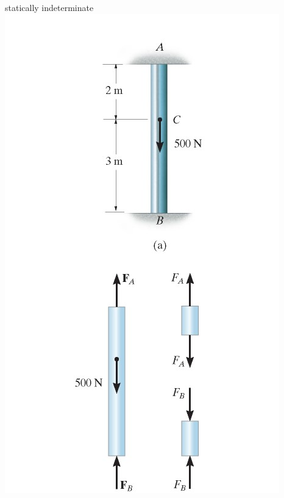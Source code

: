 \documentclass[
  letterpaper,
  ignorenonframetext,
  aspectratio=43,
  handout,
  12pt]{beamer}
\let\Oldincludegraphics\includegraphics
\renewcommand{\includegraphics}[2][]{\Oldincludegraphics[width=\textwidth,height=0.7\textheight,keepaspectratio]{#2}}
\begin{document}
\begin{frame}{statically indeterminate}
\protect\hypertarget{statically-indeterminate-3}{}
\includegraphics{../images/statically-indeterminate.jpg}
\end{frame}
\end{document}

